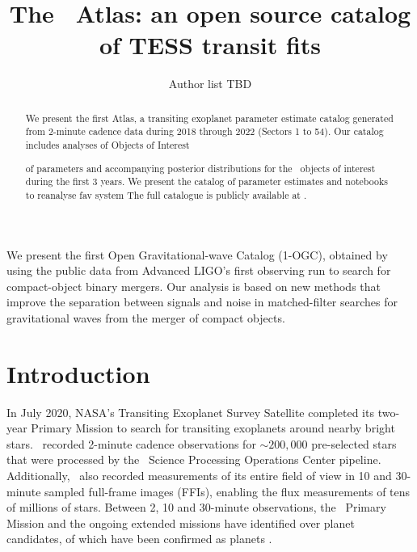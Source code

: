 \documentclass[linenumbers,floatfix,ApJL,twocolumn]{aastex631}
\begin{document}
\title{The \tess\ Atlas: an open source catalog of TESS transit fits}


\author{Author list TBD}
% 





\begin{abstract}
We present the first \tess Atlas, a transiting exoplanet parameter estimate catalog generated from 2-minute cadence \tess data during 2018 through 2022 (Sectors 1 to 54). 
Our catalog includes analyses of \red{\numAnalysed} \tess Objects of Interest

of  parameters and accompanying posterior distributions for the \tess\ objects of interest during the first 3 years.
We present the catalog of parameter estimates and notebooks to reanalyse fav system
The full catalogue is publicly available at .
\end{abstract}


We present the first Open Gravitational-wave Catalog (1-OGC), obtained by using the public data from Advanced LIGO's first observing run to search for compact-object binary mergers. Our analysis is based on new methods that improve the separation between signals and noise in matched-filter searches for gravitational waves from the merger of compact objects. 



\section{Introduction} \label{sec:intro}

In July 2020, NASA’s Transiting Exoplanet Survey Satellite \citep{Ricker:2015:JATIS} completed its two-year Primary Mission to search for transiting exoplanets around nearby bright stars. 
\tess\ recorded 2-minute cadence observations for $\sim200,000$ pre-selected stars that were processed by the \tess\ Science Processing Operations Center \citep{Jenkins:2016:SPIE} pipeline. 
Additionally, \tess\ also recorded measurements of its entire field of view in 10 and 30-minute sampled full-frame images (FFIs), enabling the flux measurements of tens of millions of stars. Between 2, 10 and 30-minute observations, the \tess\ Primary Mission and the ongoing extended missions have identified over \red{$\numTessCandidates$} planet candidates, \red{$\numTessPlanets$} of which have been confirmed as planets \citep{Stassun:2018:AJ, Stassun:2019:AJ, Guerrero:2021:ApJS, Guerrero:2021:AAS}.
\end{document}
